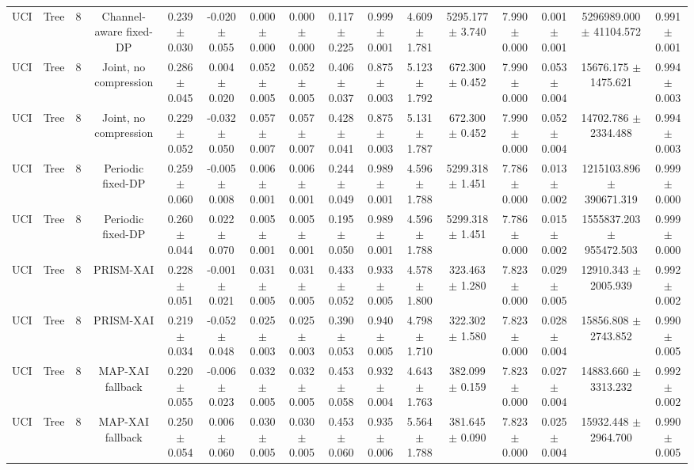\begin{tabular}{lccccccccccccccc}
UCI & Tree & 8 & Channel-aware fixed-DP & 0.239 $\pm$ 0.030 & -0.020 $\pm$ 0.055 & 0.000 $\pm$ 0.000 & 0.000 $\pm$ 0.000 & 0.117 $\pm$ 0.225 & 0.999 $\pm$ 0.001 & 4.609 $\pm$ 1.781 & 5295.177 $\pm$ 3.740 & 7.990 $\pm$ 0.000 & 0.001 $\pm$ 0.001 & 5296989.000 $\pm$ 41104.572 & 0.991 $\pm$ 0.001 \\
UCI & Tree & 8 & Joint, no compression & 0.286 $\pm$ 0.045 & 0.004 $\pm$ 0.020 & 0.052 $\pm$ 0.005 & 0.052 $\pm$ 0.005 & 0.406 $\pm$ 0.037 & 0.875 $\pm$ 0.003 & 5.123 $\pm$ 1.792 & 672.300 $\pm$ 0.452 & 7.990 $\pm$ 0.000 & 0.053 $\pm$ 0.004 & 15676.175 $\pm$ 1475.621 & 0.994 $\pm$ 0.003 \\
UCI & Tree & 8 & Joint, no compression & 0.229 $\pm$ 0.052 & -0.032 $\pm$ 0.050 & 0.057 $\pm$ 0.007 & 0.057 $\pm$ 0.007 & 0.428 $\pm$ 0.041 & 0.875 $\pm$ 0.003 & 5.131 $\pm$ 1.787 & 672.300 $\pm$ 0.452 & 7.990 $\pm$ 0.000 & 0.052 $\pm$ 0.004 & 14702.786 $\pm$ 2334.488 & 0.994 $\pm$ 0.003 \\
UCI & Tree & 8 & Periodic fixed-DP & 0.259 $\pm$ 0.060 & -0.005 $\pm$ 0.008 & 0.006 $\pm$ 0.001 & 0.006 $\pm$ 0.001 & 0.244 $\pm$ 0.049 & 0.989 $\pm$ 0.001 & 4.596 $\pm$ 1.788 & 5299.318 $\pm$ 1.451 & 7.786 $\pm$ 0.000 & 0.013 $\pm$ 0.002 & 1215103.896 $\pm$ 390671.319 & 0.999 $\pm$ 0.000 \\
UCI & Tree & 8 & Periodic fixed-DP & 0.260 $\pm$ 0.044 & 0.022 $\pm$ 0.070 & 0.005 $\pm$ 0.001 & 0.005 $\pm$ 0.001 & 0.195 $\pm$ 0.050 & 0.989 $\pm$ 0.001 & 4.596 $\pm$ 1.788 & 5299.318 $\pm$ 1.451 & 7.786 $\pm$ 0.000 & 0.015 $\pm$ 0.002 & 1555837.203 $\pm$ 955472.503 & 0.999 $\pm$ 0.000 \\
UCI & Tree & 8 & PRISM-XAI & 0.228 $\pm$ 0.051 & -0.001 $\pm$ 0.021 & 0.031 $\pm$ 0.005 & 0.031 $\pm$ 0.005 & 0.433 $\pm$ 0.052 & 0.933 $\pm$ 0.005 & 4.578 $\pm$ 1.800 & 323.463 $\pm$ 1.280 & 7.823 $\pm$ 0.000 & 0.029 $\pm$ 0.005 & 12910.343 $\pm$ 2005.939 & 0.992 $\pm$ 0.002 \\
UCI & Tree & 8 & PRISM-XAI & 0.219 $\pm$ 0.034 & -0.052 $\pm$ 0.048 & 0.025 $\pm$ 0.003 & 0.025 $\pm$ 0.003 & 0.390 $\pm$ 0.053 & 0.940 $\pm$ 0.005 & 4.798 $\pm$ 1.710 & 322.302 $\pm$ 1.580 & 7.823 $\pm$ 0.000 & 0.028 $\pm$ 0.004 & 15856.808 $\pm$ 2743.852 & 0.990 $\pm$ 0.005 \\
UCI & Tree & 8 & MAP-XAI fallback & 0.220 $\pm$ 0.055 & -0.006 $\pm$ 0.023 & 0.032 $\pm$ 0.005 & 0.032 $\pm$ 0.005 & 0.453 $\pm$ 0.058 & 0.932 $\pm$ 0.004 & 4.643 $\pm$ 1.763 & 382.099 $\pm$ 0.159 & 7.823 $\pm$ 0.000 & 0.027 $\pm$ 0.004 & 14883.660 $\pm$ 3313.232 & 0.992 $\pm$ 0.002 \\
UCI & Tree & 8 & MAP-XAI fallback & 0.250 $\pm$ 0.054 & 0.006 $\pm$ 0.060 & 0.030 $\pm$ 0.005 & 0.030 $\pm$ 0.005 & 0.453 $\pm$ 0.060 & 0.935 $\pm$ 0.006 & 5.564 $\pm$ 1.788 & 381.645 $\pm$ 0.090 & 7.823 $\pm$ 0.000 & 0.025 $\pm$ 0.004 & 15932.448 $\pm$ 2964.700 & 0.990 $\pm$ 0.005 \\
\bottomrule
\end{tabular}
